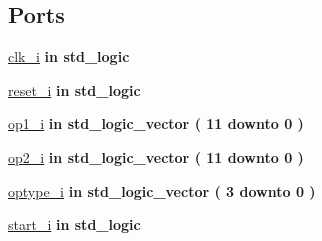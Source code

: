 \subsection*{Ports}
 \begin{DoxyCompactItemize}
\item 
\hyperlink{classalu_abe949478e3f8aad0a6aeb1842fa6c608}{clk\+\_\+i}  {\bfseries {\bfseries \textcolor{keywordflow}{in}\textcolor{vhdlchar}{ }}} {\bfseries \textcolor{comment}{std\+\_\+logic}\textcolor{vhdlchar}{ }} 
\item 
\hyperlink{classalu_a55da7e76960757f8c6842e86a28ee7be}{reset\+\_\+i}  {\bfseries {\bfseries \textcolor{keywordflow}{in}\textcolor{vhdlchar}{ }}} {\bfseries \textcolor{comment}{std\+\_\+logic}\textcolor{vhdlchar}{ }} 
\item 
\hyperlink{classalu_a1127482098676cfc6ce7e98ba675ee27}{op1\+\_\+i}  {\bfseries {\bfseries \textcolor{keywordflow}{in}\textcolor{vhdlchar}{ }}} {\bfseries \textcolor{comment}{std\+\_\+logic\+\_\+vector}\textcolor{vhdlchar}{ }\textcolor{vhdlchar}{(}\textcolor{vhdlchar}{ }\textcolor{vhdlchar}{ } \textcolor{vhdldigit}{11} \textcolor{vhdlchar}{ }\textcolor{keywordflow}{downto}\textcolor{vhdlchar}{ }\textcolor{vhdlchar}{ } \textcolor{vhdldigit}{0} \textcolor{vhdlchar}{ }\textcolor{vhdlchar}{)}\textcolor{vhdlchar}{ }} 
\item 
\hyperlink{classalu_ae346648ed4ed2217b5e8d668b165aff2}{op2\+\_\+i}  {\bfseries {\bfseries \textcolor{keywordflow}{in}\textcolor{vhdlchar}{ }}} {\bfseries \textcolor{comment}{std\+\_\+logic\+\_\+vector}\textcolor{vhdlchar}{ }\textcolor{vhdlchar}{(}\textcolor{vhdlchar}{ }\textcolor{vhdlchar}{ } \textcolor{vhdldigit}{11} \textcolor{vhdlchar}{ }\textcolor{keywordflow}{downto}\textcolor{vhdlchar}{ }\textcolor{vhdlchar}{ } \textcolor{vhdldigit}{0} \textcolor{vhdlchar}{ }\textcolor{vhdlchar}{)}\textcolor{vhdlchar}{ }} 
\item 
\hyperlink{classalu_aee662ea38c86cd2e7dc1970ce8a6d5e9}{optype\+\_\+i}  {\bfseries {\bfseries \textcolor{keywordflow}{in}\textcolor{vhdlchar}{ }}} {\bfseries \textcolor{comment}{std\+\_\+logic\+\_\+vector}\textcolor{vhdlchar}{ }\textcolor{vhdlchar}{(}\textcolor{vhdlchar}{ }\textcolor{vhdlchar}{ } \textcolor{vhdldigit}{3} \textcolor{vhdlchar}{ }\textcolor{keywordflow}{downto}\textcolor{vhdlchar}{ }\textcolor{vhdlchar}{ } \textcolor{vhdldigit}{0} \textcolor{vhdlchar}{ }\textcolor{vhdlchar}{)}\textcolor{vhdlchar}{ }} 
\item 
\hyperlink{classalu_aba7911228d421cdfd5fc4eb74a60572c}{start\+\_\+i}  {\bfseries {\bfseries \textcolor{keywordflow}{in}\textcolor{vhdlchar}{ }}} {\bfseries \textcolor{comment}{std\+\_\+logic}\textcolor{vhdlchar}{ }} 

\end{DoxyCompactItemize}
